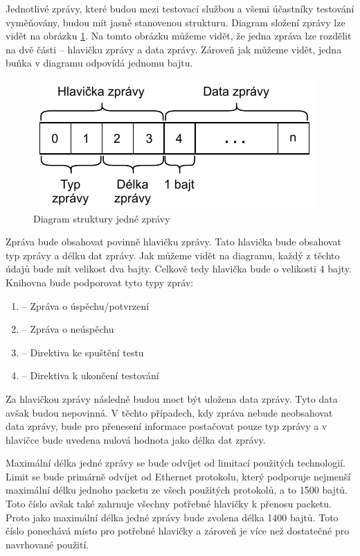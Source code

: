 Jednotlivé zprávy, které budou mezi testovací službou a všemi účastníky testování vyměňovány, budou mít jasně stanovenou strukturu. Diagram složení zprávy lze vidět na obrázku \ref{fig:message}. Na tomto obrázku můžeme vidět, že jedna zpráva lze rozdělit na dvě části -- hlavičku zprávy a data zprávy. Zároveň jak můžeme vidět, jedna buňka v diagramu odpovídá jednomu bajtu. 

\begin{figure}[htbp]
    \centering 
    \includegraphics{assets/img/message.pdf}
    \caption{Diagram struktury jedné zprávy}
    \label{fig:message}
\end{figure}

Zpráva bude obsahovat povinně hlavičku zprávy. Tato hlavička bude obsahovat typ zprávy a délku dat zprávy. Jak můžeme vidět na diagramu, každý z těchto údajů bude mít velikost dva bajty. Celkově tedy hlavička bude o velikosti 4 bajty. Knihovna bude podporovat tyto typy zpráv:

\begin{enumerate}
    \item {} -- Zpráva o úspěchu/potvrzení
    \item {} -- Zpráva o neúspěchu
    \item {} -- Direktiva ke spuštění testu
    \item {} -- Direktiva k ukončení testování
\end{enumerate}

Za hlavičkou zprávy následně budou moct být uložena data zprávy. Tyto data avšak budou nepovinná. V těchto případech, kdy zpráva nebude neobsahovat data zprávy, bude pro přenesení informace postačovat pouze typ zprávy a v hlavičce bude uvedena nulová hodnota jako délka dat zprávy. 

Maximální délka jedné zprávy se bude odvíjet od limitací použitých technologií. Limit se bude primárně odvíjet od Ethernet protokolu, který podporuje nejmenší maximální délku jednoho packetu ze všech použitých protokolů, a to 1500 bajtů. Toto číslo avšak také zahrnuje všechny potřebné hlavičky k přenosu packetu. Proto jako maximální délka jedné zprávy bude zvolena délka 1400 bajtů. Toto číslo ponechává místo pro potřebné hlavičky a zároveň je více než dostatečné pro navrhované použití. \cite{max_packet_size} 

